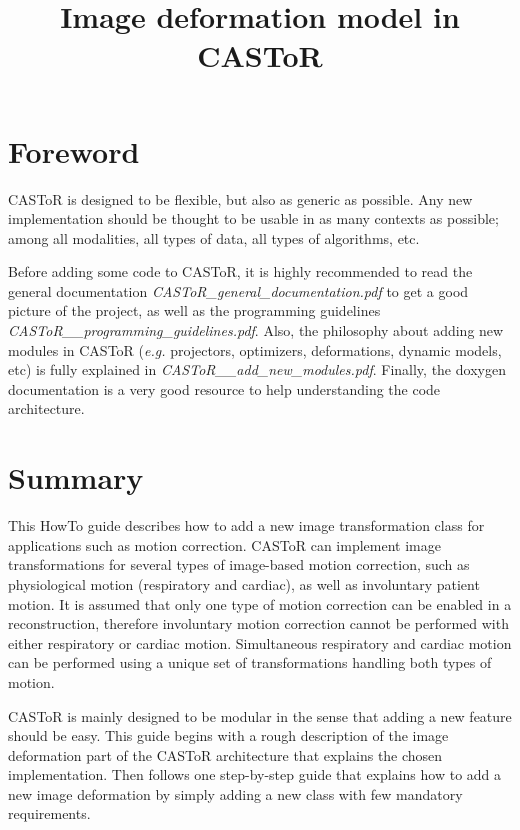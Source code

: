 \documentclass[a4paper, 11pt]{article}
\begin{document}
\title{Image deformation model in CASToR}
\maketitle

\section*{Foreword}

CASToR is designed to be flexible, but also as generic as possible.
Any new implementation should be thought to be usable in as many contexts as possible; among all modalities, all types of data, all types of algorithms, etc.

Before adding some code to CASToR, it is highly recommended to read the general documentation \textit{CASToR\_general\_documentation.pdf} to get a good
picture of the project, as well as the programming guidelines \textit{CASToR\_\_programming\_guidelines.pdf}.
Also, the philosophy about adding new modules in CASToR (\textit{e.g.} projectors, optimizers, deformations, dynamic models, etc) is fully explained in \textit{CASToR\_\_add\_new\_modules.pdf}.
Finally, the doxygen documentation is a very good resource to help understanding the code architecture.

\section{Summary}

This HowTo guide describes how to add a new image transformation class for applications such as motion correction. CASToR can implement image transformations
for several types of image-based motion correction, such as physiological motion (respiratory and cardiac), as well as involuntary patient motion. It is assumed
that only one type of motion correction can be enabled in a reconstruction, therefore involuntary motion correction cannot be performed with either respiratory
or cardiac motion. Simultaneous respiratory and cardiac motion can be performed using a unique set of transformations handling both types of motion.

CASToR is mainly designed to be modular in the sense that adding a new feature should be easy. This guide begins with a rough description of the image deformation
part of the CASToR architecture that explains the chosen implementation. Then follows one step-by-step guide that explains how to add a new image deformation by
simply adding a new class with few mandatory requirements.
\end{document}
